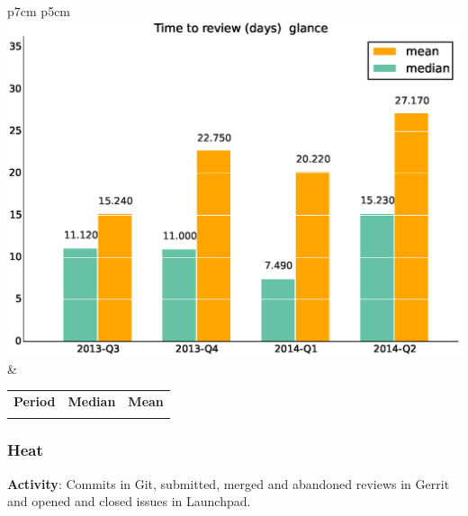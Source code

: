 \documentclass[a4wide,11pt]{report}
\begin{document}
\begin{tabular}{p{7cm} p{5cm}}
    \vspace{0pt} 
    \includegraphics[scale=.35]{figs/timetoreview_medianglance.eps}
    & 
    \vspace{0pt}
    \begin{tabular}{l|r|r|}%
    \bfseries Period & \bfseries Median & \bfseries Mean %
    \csvreader[head to column names]{data/timetoreview_medianglance.csv}{}%
    {\\ & \mediantime & \meantime}
    \end{tabular}
\end{tabular}


 \newpage 
 \subsubsection{Heat}

\textbf{Activity}: Commits in Git, submitted, merged and abandoned reviews in Gerrit and opened and closed issues in Launchpad.
\end{document}

